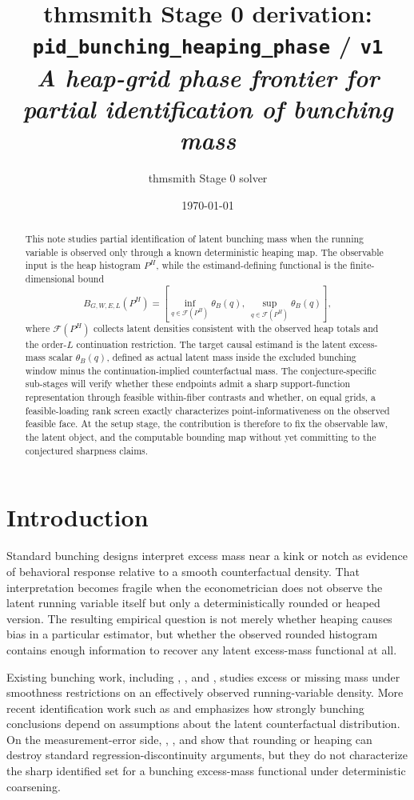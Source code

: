 \documentclass[11pt]{article}
\title{thmsmith Stage 0 derivation: \texttt{pid\_bunching\_heaping\_phase} / \texttt{v1}%
  \\ \large\textit{A heap-grid phase frontier for partial identification of bunching mass}}
\author{thmsmith Stage 0 solver}
\date{\today}
\theoremstyle{definition}
\theoremstyle{plain}
\theoremstyle{remark}
\begin{document}
\maketitle


\begin{abstract}
This note studies partial identification of latent bunching mass when the running variable is observed only through a known deterministic heaping map.  The observable input is the heap histogram \(P^H\), while the estimand-defining functional is the finite-dimensional bound
\[
B_{G,W,E,L}(P^H)=\left[\inf_{q\in\mathcal{F}(P^H)}\theta_B(q),\ \sup_{q\in\mathcal{F}(P^H)}\theta_B(q)\right],
\]
where \(\mathcal{F}(P^H)\) collects latent densities consistent with the observed heap totals and the order-\(L\) continuation restriction.  The target causal estimand is the latent excess-mass scalar \(\theta_B(q)\), defined as actual latent mass inside the excluded bunching window minus the continuation-implied counterfactual mass.  The conjecture-specific sub-stages will verify whether these endpoints admit a sharp support-function representation through feasible within-fiber contrasts and whether, on equal grids, a feasible-loading rank screen exactly characterizes point-informativeness on the observed feasible face.  At the setup stage, the contribution is therefore to fix the observable law, the latent object, and the computable bounding map without yet committing to the conjectured sharpness claims.
\end{abstract}

\section{Introduction}
Standard bunching designs interpret excess mass near a kink or notch as evidence of behavioral response relative to a smooth counterfactual density.  That interpretation becomes fragile when the econometrician does not observe the latent running variable itself but only a deterministically rounded or heaped version.  The resulting empirical question is not merely whether heaping causes bias in a particular estimator, but whether the observed rounded histogram contains enough information to recover any latent excess-mass functional at all.

Existing bunching work, including \cite{Saez2010Bunching}, \cite{ChettyFriedmanOlsenPistaferri2011Adjustment}, and \cite{KlevenWaseem2013Notches}, studies excess or missing mass under smoothness restrictions on an effectively observed running-variable density.  More recent identification work such as \cite{BertanhaMcCallumSeegert2021BetterBunching} and \cite{Song2024GeneralBunching} emphasizes how strongly bunching conclusions depend on assumptions about the latent counterfactual distribution.  On the measurement-error side, \cite{BarrecaLindoWaddell2016HeapingRD}, \cite{Dong2015RoundingRD}, and \cite{DaveziesLeBarbanchon2017RDMeasurementError} show that rounding or heaping can destroy standard regression-discontinuity arguments, but they do not characterize the sharp identified set for a bunching excess-mass functional under deterministic coarsening.
\end{document}
